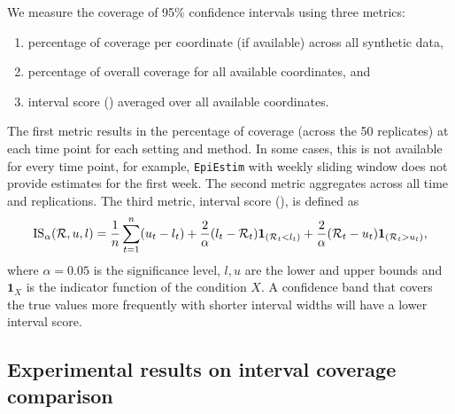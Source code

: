 \documentclass[
]{article}
\providecommand{\tightlist}{%
  \setlength{\itemsep}{0pt}\setlength{\parskip}{0pt}}
\begin{document}
We measure the coverage of 95\% confidence intervals using three metrics:

\begin{enumerate}
\def\labelenumi{\arabic{enumi}.}
\tightlist
\item
  percentage of coverage per coordinate (if available) across all synthetic data,
\item
  percentage of overall coverage for all available coordinates, and
\item
  interval score () averaged over all available coordinates.
\end{enumerate}

The first metric results in the percentage of coverage (across the 50 replicates)
at each time point for each setting and method. In some cases, this is not available
for every time point, for example, \texttt{EpiEstim} with weekly sliding window
does not provide estimates for the first week. The second metric aggregates across
all time and replications.
The third metric, interval score (), is defined as
\[\textrm{IS}_{\alpha}(\mathcal{R},u,l) = \frac{1}{n} \sum_{t=1}^n (u_t-l_t) + \frac{2}{\alpha}(l_t-\mathcal{R}_t)\boldsymbol{1}_{(\mathcal{R}_t<l_t)} + \frac{2}{\alpha}(\mathcal{R}_t-u_t)\boldsymbol{1}_{(\mathcal{R}_t>u_t)},\]
where \(\alpha=0.05\) is the significance level, \(l,u\) are the lower and upper
bounds and
\(\mathbf{1}_{X}\) is the indicator function of the condition \(X\).
A confidence band that covers the true values more frequently with shorter
interval widths will have a lower interval score.

\clearpage

\subsection{Experimental results on interval coverage comparison}\label{experimental-results-on-interval-coverage-comparison}
\end{document}
